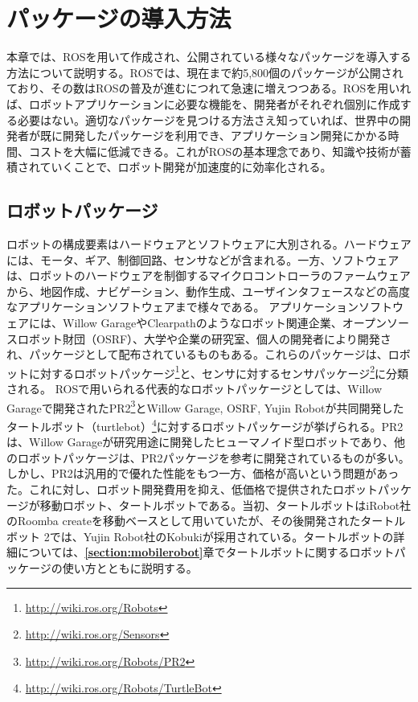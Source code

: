 
\chapter{パッケージの導入方法}
\label{section:package}

本章では、ROSを用いて作成され、公開されている様々なパッケージを導入する方法について説明する。ROSでは、現在まで約5,800個のパッケージが公開されており、その数はROSの普及が進むにつれて急速に増えつつある。ROSを用いれば、ロボットアプリケーションに必要な機能を、開発者がそれぞれ個別に作成する必要はない。適切なパッケージを見つける方法さえ知っていれば、世界中の開発者が既に開発したパッケージを利用でき、アプリケーション開発にかかる時間、コストを大幅に低減できる。これがROSの基本理念であり、知識や技術が蓄積されていくことで、ロボット開発が加速度的に効率化される。

\section{ロボットパッケージ}

ロボットの構成要素はハードウェアとソフトウェアに大別される。ハードウェアには、モータ、ギア、制御回路、センサなどが含まれる。一方、ソフトウェアは、ロボットのハードウェアを制御するマイクロコントローラのファームウェアから、地図作成、ナビゲーション、動作生成、ユーザインタフェースなどの高度なアプリケーションソフトウェアまで様々である。
アプリケーションソフトウェアには、Willow GarageやClearpathのようなロボット関連企業、オープンソースロボット財団（OSRF）、大学や企業の研究室、個人の開発者により開発され、パッケージとして配布されているものもある。これらのパッケージは、ロボットに対するロボットパッケージ\footnote{\url{http://wiki.ros.org/Robots}}と、センサに対するセンサパッケージ\footnote{\url{http://wiki.ros.org/Sensors}}に分類される。
ROSで用いられる代表的なロボットパッケージとしては、Willow Garageで開発されたPR2\footnote{\url{http://wiki.ros.org/Robots/PR2}}とWillow Garage, OSRF, Yujin Robotが共同開発したタートルボット（turtlebot）\footnote{\url{http://wiki.ros.org/Robots/TurtleBot}}に対するロボットパッケージが挙げられる。PR2は、Willow Garageが研究用途に開発したヒューマノイド型ロボットであり、他のロボットパッケージは、PR2パッケージを参考に開発されているものが多い。しかし、PR2は汎用的で優れた性能をもつ一方、価格が高いという問題があった。これに対し、ロボット開発費用を抑え、低価格で提供されたロボットパッケージが移動ロボット、タートルボットである。当初、タートルボットはiRobot社のRoomba createを移動ベースとして用いていたが、その後開発されたタートルボット 2では、Yujin Robot社のKobukiが採用されている。タートルボットの詳細については、\textbf{\ref{section:mobilerobot}}章でタートルボットに関するロボットパッケージの使い方とともに説明する。


